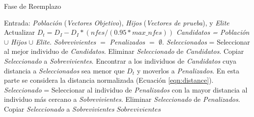 \begin{algorithm}[t]
  \scriptsize
	\caption{Fase de Reemplazo} \label{alg:Replacement}
	\begin{algorithmic}[1]
	\STATE Entrada: \textit{Población} (\textit{Vectores Objetivo}), \textit{Hijos} (\textit{Vectores de prueba}), y \textit{Elite}
	\STATE Actualizar $D_t = D_I - D_I *(nfes/(0.95*max\_nfes)) $ 
	\STATE \textit{Candidatos = Población} $\cup$ \textit{Hijos} $\cup$ \textit{Elite}.
	\STATE \textit{Sobrevivientes} $=$ \textit{Penalizados} $=$ $\emptyset$.
	   \STATE \textit{Seleccionados} = Seleccionar al mejor individuo de \textit{Candidatos}.
		 \STATE Eliminar \textit{Seleccionado} de \textit{Candidatos}.
	   \STATE Copiar \textit{Seleccionado} a \textit{Sobrevivientes}.
	   \STATE Encontrar a los individuos de \textit{Candidatos} cuya distancia a \textit{Seleccionados} sea menor que $D_t$ y moverlos a \textit{Penalizados}. En esta parte se considera la distancia normalizada (Ecuación \ref{eqn:distance}).
	\ENDWHILE
	   \STATE \textit{Seleccionado} = Seleccionar al individuo de \textit{Penalizados} con la mayor distancia al individuo más cercano a \textit{Sobrevivientes}.
		 \STATE Eliminar \textit{Seleccionado} de \textit{Penalizados}.
	   \STATE Copiar \textit{Seleccionado} a \textit{Sobrevivientes}
	\ENDWHILE
  \RETURN $Sobrevivientes$
\end{algorithmic}
\end{algorithm}

